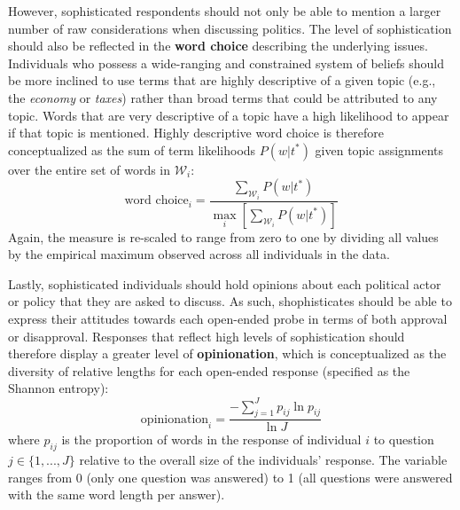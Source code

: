 \documentclass[12pt]{article}
\begin{document}
However, sophisticated respondents should not only be able to mention a larger number of raw considerations when discussing politics. The level of sophistication should also be reflected in the \textbf{word choice} describing the underlying issues. Individuals who possess a wide-ranging and constrained system of beliefs should be more inclined to use terms that are highly descriptive of a given topic (e.g., the \textit{economy} or \textit{taxes}) rather than broad terms that could be attributed to any topic. Words that are very descriptive of a topic have a high likelihood to appear if that topic is mentioned. Highly descriptive word choice is therefore conceptualized as the sum of term likelihoods $P(w|t^*)$ given topic assignments over the entire set of words in $\mathcal{W}_i$:
\begin{equation}
\text{word choice}_i = \dfrac{\sum_{\mathcal{W}_i} P(w|t^*)}{\max_i\left[\sum_{\mathcal{W}_i} P(w|t^*)\right]}
\end{equation}
Again, the measure is re-scaled to range from zero to one by dividing all values by the empirical maximum observed across all individuals in the data.

Lastly, sophisticated individuals should hold opinions about each political actor or policy that they are asked to discuss. As such, shophisticates should be able to express their attitudes towards each open-ended probe in terms of both approval or disapproval. Responses that reflect high levels of sophistication should therefore display a greater level of \textbf{opinionation}, which is conceptualized as the diversity of relative lengths for each open-ended response (specified as the Shannon entropy):
\begin{equation}
\text{opinionation}_i = \dfrac{-\sum_{j=1}^J p_{ij} \ln p_{ij}}{\ln J}
\end{equation}
where $p_{ij}$ is the proportion of words in the response of individual $i$ to question $j\in \{1,...,J\}$ relative to the overall size of the individuals' response. The variable ranges from 0 (only one question was answered) to 1 (all questions were answered with the same word length per answer).
\end{document}
